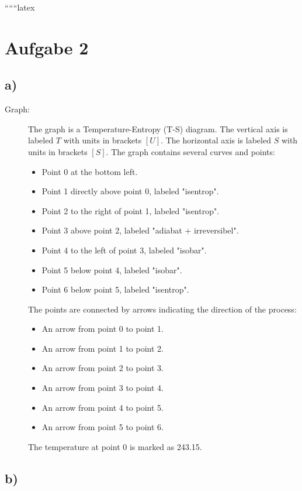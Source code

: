
``````latex


\section*{Aufgabe 2}

\subsection*{a)}

\begin{description}
    \item[Graph:] The graph is a Temperature-Entropy (T-S) diagram. The vertical axis is labeled \( T \) with units in brackets \([U]\). The horizontal axis is labeled \( S \) with units in brackets \([S]\). The graph contains several curves and points:
    \begin{itemize}
        \item Point 0 at the bottom left.
        \item Point 1 directly above point 0, labeled "isentrop".
        \item Point 2 to the right of point 1, labeled "isentrop".
        \item Point 3 above point 2, labeled "adiabat + irreversibel".
        \item Point 4 to the left of point 3, labeled "isobar".
        \item Point 5 below point 4, labeled "isobar".
        \item Point 6 below point 5, labeled "isentrop".
    \end{itemize}
    The points are connected by arrows indicating the direction of the process:
    \begin{itemize}
        \item An arrow from point 0 to point 1.
        \item An arrow from point 1 to point 2.
        \item An arrow from point 2 to point 3.
        \item An arrow from point 3 to point 4.
        \item An arrow from point 4 to point 5.
        \item An arrow from point 5 to point 6.
    \end{itemize}
    The temperature at point 0 is marked as 243.15.
\end{description}

\subsection*{b)}

